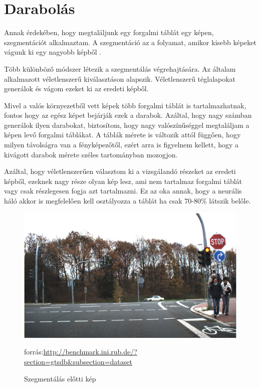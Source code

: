\chapter{Darabolás}\label{ch:SEGMENT}

Annak érdekében, hogy megtaláljunk egy forgalmi táblát egy képen, szegmentációt alkalmaztam. A szegmentáció az a folyamat, amikor kisebb képeket vágunk ki egy nagyobb képből \cite{7}.

Több különböző módszer létezik a szegmentálás végrehajtására. Az általam alkalmazott véletlenszerű kiválasztáson alapszik. Véletlenszerű téglalapokat generálok és vágom ezeket ki az eredeti képből.

Mivel a valós környezetből vett képek több forgalmi táblát is tartalmazhatnak, fontos hogy az egész képet bejárják ezek a darabok. Azáltal, hogy nagy számban generálok ilyen darabokat, biztosítom, hogy nagy valószínűséggel megtaláljam a képen levő forgalmi táblákat. A táblák mérete is változik attól függően, hogy milyen távolságra van a fényképezőtől, ezért arra is figyelnem kellett, hogy a kivágott darabok mérete széles tartományban mozogjon.

Azáltal, hogy véletlenszerűen választom ki a vizsgálandó részeket az eredeti képből, ezeknek nagy része olyan kép lesz, ami nem tartalmaz forgalmi táblát vagy csak részlegesen fogja azt tartalmazni. Ez az oka annak, hogy a neurális háló akkor is megfelelően kell osztályozza a táblát ha csak 70-80\% látszik belőle.


\begin{figure}[h]
\centering

\includegraphics[scale=0.35]{images/testImage2}
\caption{Szegmentálás előtti kép}
\small forrás:\url{http://benchmark.ini.rub.de/?section=gtsdb&subsection=dataset}

\label{fig:testImage2}
\end{figure}

